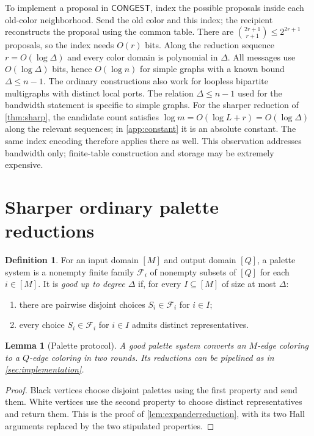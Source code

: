 \documentclass[11pt]{article}
\newtheorem{lemma}[theorem]{Lemma}
\theoremstyle{definition}
\newtheorem{definition}[theorem]{Definition}
\theoremstyle{remark}
\newcommand{\F}{\mathcal F}
\newcommand{\CONGEST}{\ensuremath{\mathsf{CONGEST}}}
\begin{document}
To implement a proposal in \CONGEST, index the possible proposals inside
each old-color neighborhood. Send the old color and this index; the
recipient reconstructs the proposal using the common table. There are
$\binom{2r+1}{r+1}\le2^{2r+1}$ proposals, so the index needs $O(r)$ bits.
Along the reduction sequence $r=O(\log\Delta)$ and every color domain is
polynomial in $\Delta$. All messages use $O(\log\Delta)$ bits, hence
$O(\log n)$ for simple graphs with a known bound $\Delta\le n-1$.
The ordinary constructions also work for loopless bipartite multigraphs with distinct local ports. The relation $\Delta\le n-1$ used for the bandwidth statement is specific to simple graphs. For the sharper reduction of \cref{thm:sharp}, the candidate count satisfies $\log m=O(\log L+r)=O(\log\Delta)$ along the relevant sequences; in \cref{app:constant} it is an absolute constant. The same index encoding therefore applies there as well. This observation addresses bandwidth only; finite-table construction
and storage may be extremely expensive.

\section{Sharper ordinary palette reductions}\label{sec:sharp}

\begin{definition}\label{def:families}
For an input domain $[M]$ and output domain $[Q]$, a palette system is
a nonempty finite family $\F_i$ of nonempty subsets of $[Q]$ for each
$i\in[M]$. It is \emph{good up to degree $\Delta$} if, for every
$I\subseteq[M]$ of size at most $\Delta$:
\begin{enumerate}
\item there are pairwise disjoint choices $S_i\in\F_i$ for $i\in I$;
\item every choice $S_i\in\F_i$ for $i\in I$ admits distinct representatives.
\end{enumerate}
\end{definition}

\begin{lemma}[Palette protocol]\label{lem:protocol}
A good palette system converts an $M$-edge coloring to a $Q$-edge
coloring in two rounds. Its reductions can be pipelined as in
\cref{sec:implementation}.
\end{lemma}
\begin{proof}
Black vertices choose disjoint palettes using the first property and
send them. White vertices use the second property to choose distinct
representatives and return them. This is the proof of
\cref{lem:expanderreduction}, with its two Hall arguments replaced by
the two stipulated properties.
\end{proof}
\end{document}
